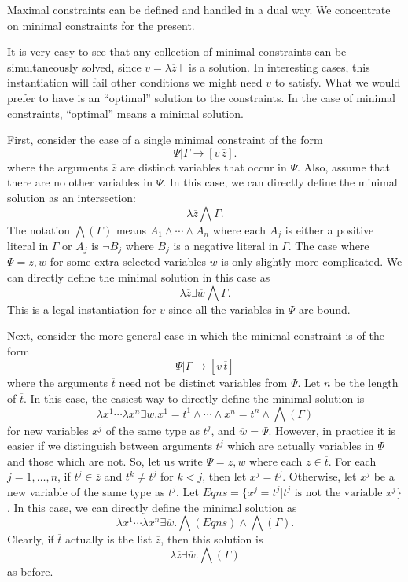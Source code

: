 Maximal constraints can be defined and handled in a dual way. 
We concentrate on minimal constraints for the present.  %

It is very easy to see that any collection of minimal constraints
can be simultaneously solved, since $v = \lambda \overline{z} \top$
is a solution.  In interesting cases, this instantiation will fail
other conditions we might need $v$ to satisfy.  What we would prefer
to have is an ``optimal'' solution to the constraints.  In the case of minimal
constraints, ``optimal'' means a minimal solution.

First, consider the case of a single minimal constraint of the form
$$\Psi | \Gamma \rightarrow [v\, \overline{z}].$$
where the arguments $\overline{z}$ are distinct variables
that occur in $\Psi$.  Also, assume that there are no
other variables in $\Psi$.
In this case, we can directly define
the minimal solution as an intersection:
$$\lambda \overline{z} \bigwedge{\Gamma}.$$
The notation $\bigwedge(\Gamma)$ means
$A_1 \wedge\cdots\wedge A_n$
where each $A_j$ is either a positive literal
in $\Gamma$ or $A_j$ is $\lnot B_j$ where
$B_j$ is a negative literal in $\Gamma$.
The case where $\Psi = \overline{z},\overline{w}$
for some extra selected variables $\overline{w}$
is only slightly more complicated.  We can directly
define the minimal solution in this case as
$$\lambda \overline{z} \exists \overline{w} \bigwedge{\Gamma}.$$
This is a legal instantiation for $v$ since all the variables
in $\Psi$ are bound.

Next, consider the more general case in which the minimal constraint is of the form
$$\Psi | \Gamma \rightarrow [v\, \overline{t}]$$
where the arguments $\overline{t}$ need not be distinct 
variables from $\Psi$.  Let $n$ be the length of $\overline{t}$.
In this case, the easiest way to directly define the minimal solution
is
$$\lambda x^1\cdots \lambda x^n \exists \overline{w} . 
x^1 = t^1 \wedge \cdots \wedge x^n = t^n \wedge \bigwedge(\Gamma)$$
for new variables $x^j$ of the same type as $t^j$,
and $\overline{w} = \Psi$.
However, in practice it is easier if we distinguish between
arguments $t^j$ which are actually variables in $\Psi$ and those which are not.
So, let us write $\Psi = \overline{z},\overline{w}$
where each $z\in\overline{t}$.  
For each $j=1,\ldots, n$, 
if $t^j\in\overline{z}$ and
$t^k\neq t^j$ for $k<j$, then let $x^j = t^j$.  Otherwise,
let $x^j$ be a new variable of the same type as $t^j$.
Let $Eqns = \{x^j = t^j | t^j \mbox{ is not the variable } x^j\}$.
In this case, we can directly define the minimal solution as
$$\lambda x^1\cdots \lambda x^n \exists \overline{w} .
   \bigwedge(Eqns) \wedge \bigwedge(\Gamma).$$
Clearly, if $\overline{t}$ actually is the list $\overline{z}$, then this
solution is
$$\lambda \overline{z} \exists \overline{w} . \bigwedge(\Gamma)$$
as before.

